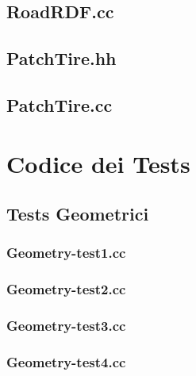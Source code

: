 \section{RoadRDF.cc}
\renewcommand{\baselinestretch}{1.0}

\renewcommand{\baselinestretch}{1.25}
%
\section{PatchTire.hh}
\renewcommand{\baselinestretch}{1.0}

\renewcommand{\baselinestretch}{1.25}
%
\section{PatchTire.cc}
\renewcommand{\baselinestretch}{1.0}

\renewcommand{\baselinestretch}{1.25}
%
\chapter{Codice dei Tests}
\label{TestsCode}
%
\section{Tests Geometrici}
%
\subsection{Geometry-test1.cc}
\renewcommand{\baselinestretch}{1.0}

\renewcommand{\baselinestretch}{1.25}
%
\subsection{Geometry-test2.cc}
\renewcommand{\baselinestretch}{1.0}

\renewcommand{\baselinestretch}{1.25}
%
\subsection{Geometry-test3.cc}
\renewcommand{\baselinestretch}{1.0}

\renewcommand{\baselinestretch}{1.25}
%
\subsection{Geometry-test4.cc}
\renewcommand{\baselinestretch}{1.0}

\renewcommand{\baselinestretch}{1.25}
%

